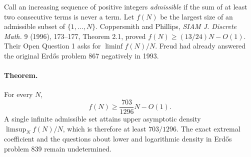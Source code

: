 \documentclass[11pt]{article}
\begin{document}
Call an increasing sequence of positive integers \emph{admissible} if the sum of at least two consecutive terms is never a term. Let $f(N)$ be the largest size of an admissible subset of $\{1,\dots,N\}$. Coppersmith and Phillips, \emph{SIAM J. Discrete Math.} 9 (1996), 173--177, Theorem 2.1, proved $f(N)\ge (13/24)N-O(1)$. Their Open Question 1 asks for $\liminf f(N)/N$. Freud had already answered the original Erd\H{o}s problem 867 negatively in 1993.

\paragraph{Theorem.} For every $N$,
\[
f(N)\ge \frac{703}{1296}N-O(1).
\]
A single infinite admissible set attains upper asymptotic density $\limsup_N f(N)/N$, which is therefore at least $703/1296$. The exact extremal coefficient and the questions about lower and logarithmic density in Erd\H{o}s problem 839 remain undetermined.
\end{document}
